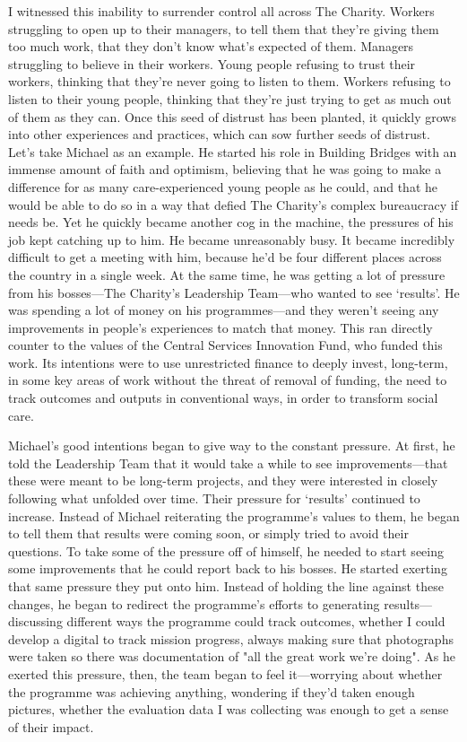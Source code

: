 I witnessed this inability to surrender control all across The Charity. Workers struggling to open up to their managers, to tell them that they’re giving them too much work, that they don’t know what's expected of them. Managers struggling to believe in their workers. Young people refusing to trust their workers, thinking that they’re never going to listen to them. Workers refusing to listen to their young people, thinking that they’re just trying to get as much out of them as they can. Once this seed of distrust has been planted, it quickly grows into other experiences and practices, which can sow further seeds of distrust. Let’s take Michael as an example. He started his role in Building Bridges with an immense amount of faith and optimism, believing that he was going to make a difference for as many care-experienced young people as he could, and that he would be able to do so in a way that defied The Charity's complex bureaucracy if needs be. Yet he quickly became another cog in the machine, the pressures of his job kept catching up to him. He became unreasonably busy. It became incredibly difficult to get a meeting with him, because he’d be four different places across the country in a single week. At the same time, he was getting a lot of pressure from his bosses—The Charity’s Leadership Team—who wanted to see `results'. He was spending a lot of money on his programmes—and they weren’t seeing any improvements in people’s experiences to match that money. This ran directly counter to the values of the Central Services Innovation Fund, who funded this work. Its intentions were to use unrestricted finance to deeply invest, long-term, in some key areas of work without the threat of removal of funding, the need to track outcomes and outputs in conventional ways, in order to transform social care.

Michael’s good intentions began to give way to the constant pressure. At first, he told the Leadership Team that it would take a while to see improvements—that these were meant to be long-term projects, and they were interested in closely following what unfolded over time. Their pressure for `results' continued to increase. Instead of Michael reiterating the programme's values to them, he began to tell them that results were coming soon, or simply tried to avoid their questions. To take some of the pressure off of himself, he needed to start seeing some improvements that he could report back to his bosses. He started exerting that same pressure they put onto him. Instead of holding the line against these changes, he began to redirect the programme’s efforts to generating results—discussing different ways the programme could track outcomes, whether I could develop a digital to track mission progress, always making sure that photographs were taken so there was documentation of "all the great work we’re doing". As he exerted this pressure, then, the team began to feel it—worrying about whether the programme was achieving anything, wondering if they’d taken enough pictures, whether the evaluation data I was collecting was enough to get a sense of their impact.

